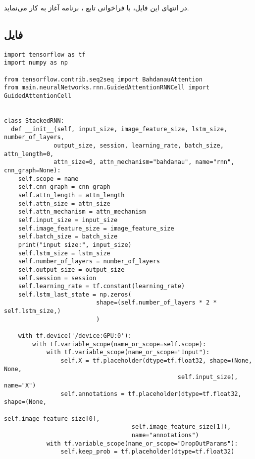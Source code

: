 در انتهای این فایل، با فراخوانی تابع ، برنامه آغاز به کار می‌نماید.

\subsection*{فایل }


\begin{latin}
\begin{verbatim}
import tensorflow as tf
import numpy as np

from tensorflow.contrib.seq2seq import BahdanauAttention
from main.neuralNetworks.rnn.GuidedAttentionRNNCell import GuidedAttentionCell


class StackedRNN:
  def __init__(self, input_size, image_feature_size, lstm_size, number_of_layers, 
              output_size, session, learning_rate, batch_size, attn_length=0, 
              attn_size=0, attn_mechanism="bahdanau", name="rnn", cnn_graph=None):
    self.scope = name
    self.cnn_graph = cnn_graph
    self.attn_length = attn_length
    self.attn_size = attn_size
    self.attn_mechanism = attn_mechanism
    self.input_size = input_size
    self.image_feature_size = image_feature_size
    self.batch_size = batch_size
    print("input size:", input_size)
    self.lstm_size = lstm_size
    self.number_of_layers = number_of_layers
    self.output_size = output_size
    self.session = session
    self.learning_rate = tf.constant(learning_rate)
    self.lstm_last_state = np.zeros(
                          shape=(self.number_of_layers * 2 * self.lstm_size,)
                          )

    with tf.device('/device:GPU:0'):
        with tf.variable_scope(name_or_scope=self.scope):
            with tf.variable_scope(name_or_scope="Input"):
                self.X = tf.placeholder(dtype=tf.float32, shape=(None, None,
                                                 self.input_size), name="X")
                self.annotations = tf.placeholder(dtype=tf.float32, shape=(None,
                                                 self.image_feature_size[0],
                                    self.image_feature_size[1]),
                                    name="annotations")
            with tf.variable_scope(name_or_scope="DropOutParams"):
                self.keep_prob = tf.placeholder(dtype=tf.float32)


\end{verbatim}
\end{latin}
